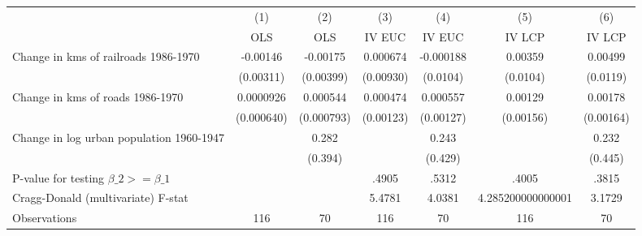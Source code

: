 {
\def\sym#1{\ifmmode^{#1}\else\(^{#1}\)\fi}
\begin{tabular}{l*{6}{c}}
\hline\hline
                &\multicolumn{1}{c}{(1)}&\multicolumn{1}{c}{(2)}&\multicolumn{1}{c}{(3)}&\multicolumn{1}{c}{(4)}&\multicolumn{1}{c}{(5)}&\multicolumn{1}{c}{(6)}\\
                &\multicolumn{1}{c}{OLS}&\multicolumn{1}{c}{OLS}&\multicolumn{1}{c}{IV EUC}&\multicolumn{1}{c}{IV EUC}&\multicolumn{1}{c}{IV LCP}&\multicolumn{1}{c}{IV LCP}\\
\hline
Change in kms of railroads 1986-1970& -0.00146         & -0.00175         & 0.000674         &-0.000188         &  0.00359         &  0.00499         \\
                &(0.00311)         &(0.00399)         &(0.00930)         & (0.0104)         & (0.0104)         & (0.0119)         \\
[1em]
Change in kms of roads 1986-1970&0.0000926         & 0.000544         & 0.000474         & 0.000557         &  0.00129         &  0.00178         \\
                &(0.000640)         &(0.000793)         &(0.00123)         &(0.00127)         &(0.00156)         &(0.00164)         \\
[1em]
Change in log urban population 1960-1947&                  &    0.282         &                  &    0.243         &                  &    0.232         \\
                &                  &  (0.394)         &                  &  (0.429)         &                  &  (0.445)         \\
\hline
P-value for testing $\beta\_{2} >= \beta\_{1}$&                  &                  &    .4905         &    .5312         &    .4005         &    .3815         \\
Cragg-Donald (multivariate) F-stat&                  &                  &   5.4781         &   4.0381         &4.285200000000001         &   3.1729         \\
Observations    &      116         &       70         &      116         &       70         &      116         &       70         \\
\hline\hline
\end{tabular}
}
